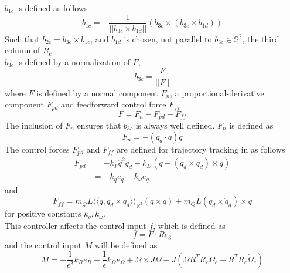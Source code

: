  $ b_{1c} $ is defined as follows
\begin{equation}\label{key}
b_{1c}=-\frac{1}{||b_{3c}\times b_{1d}||}(b_{3c}\times(b_{3c}\times b_{1d}))
\end{equation}
Such that $ b_{2c}= b_{3c}\times b_{1c}$, and $ b_{1d} $ is chosen, not parallel to $ b_{3c} \in \mathbb{S}^2 $, the third column of $ R_c $.\\
 $ b_{3c} $ is defined by a normalization of $ F $,
\begin{equation}\label{eq:con.b3c}
b_{3c}=\frac{F}{||F||}
\end{equation}
where $F $ is defined by a normal component $ F_n $, a proportional-derivative component $ F_{pd} $ and feedforward control force $ F_{ff}$
\begin{equation}\label{eq:con.F}
F=F_n-F_{pd}-F_{ff}
\end{equation}
The inclusion of $ F_n $ ensures that $ b_{3c} $ is always well defined. $ F_n $ is defined as
\begin{equation}\label{eq:con.Fn}
F_n=-(q_d\cdot q)q
\end{equation}
The control forces $ F_{pd} $ and $ F_{ff} $ are defined for trajectory tracking in \cite[11.2.5]{Bullo2005} as follows
\begin{equation}\label{eq:con.Fpd}
\begin{aligned}
F_{pd}&=-k_P\hat{q}^2q_d-k_D(\dot{q}-(q_d\times\dot{q}_d)\times q)\\
&=-k_qe_q-k_\omega e_{\dot{q}}
\end{aligned}
\end{equation}
and
\begin{equation}\label{key}
F_{ff}=m_QL\langle\!\langle q,q_d\times\dot{q}_d\rangle\!\rangle_{\mathbb{R}^3}(q\times \dot{q})+m_QL(q_d\times \ddot{q}_d)\times q
\end{equation}
for positive constants $ k_q, k_\omega $.\\	
This controller affects the control input $ f $, which is defined as
\begin{equation}\label{eq:con.fLoadatt}
f=F\cdot Re_3
\end{equation}
and the control input $ M $ will be defined as
\begin{equation}\label{eq:con.MLoadatt}
M = -\frac{1}{\epsilon^2}k_Re_R-\frac{1}{\epsilon}k_\Omega e_\Omega+\Omega\times J\Omega-J(\hat{\Omega}R^TR_c\Omega_c-R^TR_c\dot{\Omega}_c)
\end{equation} 

